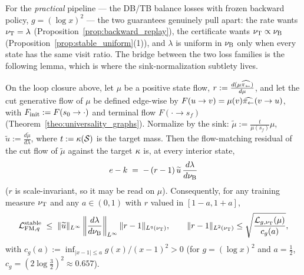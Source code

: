 For the \emph{practical} pipeline --- the DB/TB balance losses with frozen backward
policy, $g=(\log x)^2$ --- the two guarantees genuinely pull apart: the rate wants
$\nu_{\mathrm{T}}=\lambda$ (Proposition~\ref{prop:backward_replay}), the certificate wants
$\nu_{\mathrm{T}}\propto\nu_{\mathrm{B}}$ (Proposition~\ref{prop:stable_uniform}(1)), and $\lambda$ is
uniform in $\nu_{\mathrm{B}}$ only when every state has the same visit ratio. The bridge between
the two loss families is the following lemma, which is where the sink-normalization
subtlety lives.

\begin{lemma}\label{lem:transfer}
On the loop closure above, let $\mu$ be a positive state flow, $r:=\frac{d(\mu\widehat{\pi_{\leftarrow}})}{d\mu}$,
and let the cut generative flow of $\mu$ be defined edge-wise by
$F(u\rightarrow v)=\mu(v)\widehat{\pi_{\leftarrow}}(v\rightarrow u)$, with
$F_{\mathrm{init}}:=F(s_0\rightarrow\cdot)$ and terminal flow $F(\cdot\rightarrow s_f)$
(Theorem~\ref{theo:universality_graphs}). Normalize by the sink:
$\widetilde\mu:=\frac{t}{\mu(s_f)}\mu$, $\widetilde u:=\frac{d\widetilde\mu}{d\lambda}$,
where $t:=\kappa(\mathcal S)$ is the target mass.
Then the flow-matching residual of the cut flow of $\widetilde\mu$ against the target
$\kappa$ is, at every interior state,
\begin{equation}\label{equ:transfer_identity}
    e-k \;=\; -\,(r-1)\,\widetilde u\,\frac{d\lambda}{d\nu_{\mathrm{B}}}
\end{equation}
($r$ is scale-invariant, so it may be read on $\mu$). Consequently, for any training
measure $\nu_{\mathrm{T}}$ and any $a\in(0,1)$ with $r$ valued in $[1-a,1+a]$,
\begin{equation}\label{equ:transfer_bound}
    \mathcal L_{\mathrm{FM},q}^{\mathrm{stable}}\;\leq\;\|\widetilde u\|_{L^\infty}
    \left\|\frac{d\lambda}{d\nu_{\mathrm{B}}}\right\|_{L^\infty}\|r-1\|_{L^q(\nu_{\mathrm{T}})},
    \qquad
    \|r-1\|_{L^2(\nu_{\mathrm{T}})}\leq\sqrt{\frac{\mathcal L_{g,\nu_{\mathrm{T}}}(\mu)}{c_g(a)}},
\end{equation}
with $c_g(a):=\inf_{|x-1|\leq a}g(x)/(x-1)^2>0$ (for $g=(\log x)^2$ and $a=\frac12$,
$c_g=(2\log\frac32)^2\approx0.657$).
\end{lemma}

